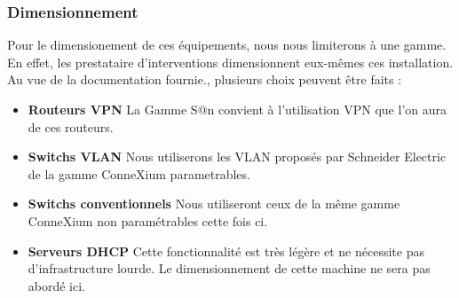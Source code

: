 \documentclass[a4paper]{article}
\begin{document}
	\subsubsection{Dimensionnement}
Pour le dimensionement de ces équipements, nous nous limiterons à une gamme. En effet, les prestataire d'interventions dimensionnent eux-mêmes ces installation.\\
Au vue de la documentation fournie., plusieurs choix peuvent être faits : 
\begin{itemize}
	\item \textbf{Routeurs VPN} La Gamme S@n convient à l'utilisation VPN que l'on aura de ces routeurs.
	\item \textbf{Switchs VLAN} Nous utiliserons les VLAN proposés par Schneider Electric de la gamme ConneXium parametrables. 
	\item \textbf{Switchs conventionnels} Nous utiliseront ceux de la même gamme ConneXium non paramétrables cette fois ci. 
	\item \textbf{Serveurs DHCP} Cette fonctionnalité est très légère et ne nécessite pas d'infrastructure lourde. Le dimensionnement de cette machine ne sera pas abordé ici.
\end{itemize}
	
	
\end{document}
